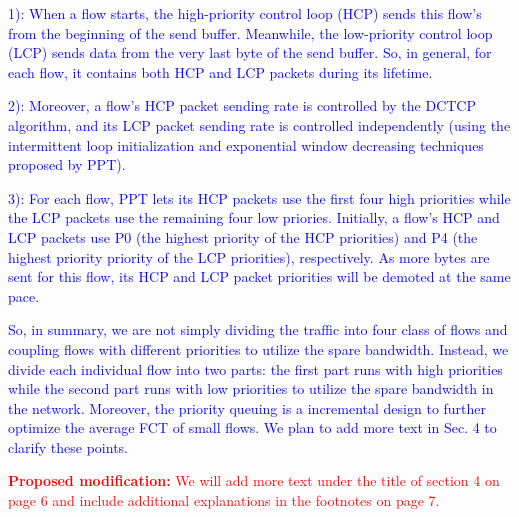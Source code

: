 \documentclass[12pt,one-column]{article}
\begin{document}
\textcolor{blue}{1): When a flow starts, the high-priority control loop (HCP) sends this flow's from the beginning of the send buffer. Meanwhile, the low-priority control loop (LCP) sends data from the very last byte of the send buffer. So, in general, for each flow, it contains both HCP and LCP packets during its lifetime. }

\textcolor{blue}{2): Moreover, a flow's HCP packet sending rate is controlled by the DCTCP algorithm, and its LCP packet sending rate is controlled independently (using the intermittent loop initialization and exponential window decreasing techniques proposed by PPT). 
}

\textcolor{blue}{3): For each flow, PPT lets its HCP packets use the first four high priorities while the LCP packets use the remaining four low priories. Initially, a flow's HCP and LCP packets use  P0 (the highest priority of the HCP priorities) and P4 (the highest priority priority of the LCP priorities), respectively. As more bytes are sent for this flow, its HCP and LCP packet priorities will be demoted at the same pace.
}

\textcolor{blue}{So, in summary, we are not simply dividing the traffic into four class of flows and coupling flows with different priorities to utilize the spare bandwidth. Instead, we divide each individual flow into two parts: the first part runs with high priorities while the second part runs with low priorities to utilize the spare bandwidth in the network. Moreover, the priority queuing is a incremental design to further optimize the average FCT of small flows. We plan to add more text in Sec. 4 to clarify these points.
}

\noindent\textcolor{red}{\textbf{Proposed modification: }
We will add more text under the title of section 4 on page 6 and include additional explanations in the footnotes on page 7.
}

\end{document}
